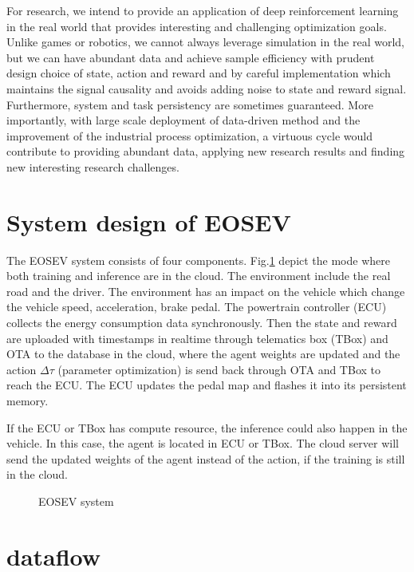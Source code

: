 \documentclass{article}
\begin{document}
For research, we intend to provide an application of deep reinforcement learning in the real world that provides interesting and challenging optimization goals. Unlike games or robotics, we cannot always leverage simulation in the real world, but we can have abundant data and achieve sample efficiency with prudent design choice of state, action and reward and by careful implementation which maintains the signal causality and avoids adding noise to state and reward signal. Furthermore, system and task persistency are sometimes guaranteed. More importantly, with large scale deployment of data-driven method and the improvement of the industrial process optimization, a virtuous cycle would contribute to providing abundant data, applying new research results and finding new interesting research challenges.

\begin{appendices}

	\section{System design of EOSEV}\label{sec:system design}

	The EOSEV system consists of four components. Fig.\@\ref{fig:EOSEV system} depict the mode where both training and inference are in the cloud. The environment include the real road and the driver. The environment has an impact on the vehicle which change the vehicle speed, acceleration, brake pedal. The powertrain controller (ECU) collects the energy consumption data synchronously. Then the state and reward are uploaded with timestamps in realtime through telematics box (TBox) and OTA to the database in the cloud, where the agent weights are updated and the action $\Delta\tau$ (parameter optimization) is send back through OTA and TBox to reach the ECU. The ECU updates the pedal map and flashes it into its persistent memory.

	If the ECU or TBox has compute resource, the inference could also happen in the vehicle. In this case, the agent is located in ECU or TBox. The cloud server will send the updated weights of the agent instead of the action, if the training is still in the cloud.

	\begin{figure}[ht]
		\centering
		\def\svgwidth{0.8\columnwidth}
		
		\caption{\label{fig:veos} EOSEV system}\label{fig:EOSEV system}
	\end{figure}

	\section{dataflow}\label{sec:dataflow}


\end{appendices}
\end{document}
